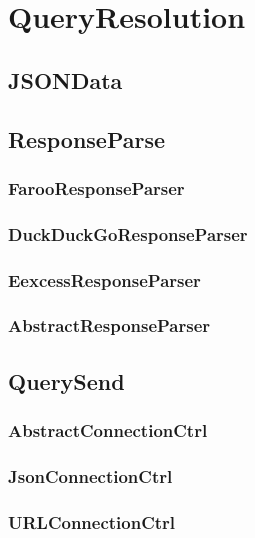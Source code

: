 
\section{QueryResolution}

\subsection{JSONData}

\subsection{ResponseParse}
\subsubsection{FarooResponseParser}
\subsubsection{DuckDuckGoResponseParser}
\subsubsection{EexcessResponseParser}
\subsubsection{AbstractResponseParser}

\subsection{QuerySend}
\subsubsection{AbstractConnectionCtrl}
\subsubsection{JsonConnectionCtrl}
\subsubsection{URLConnectionCtrl}

